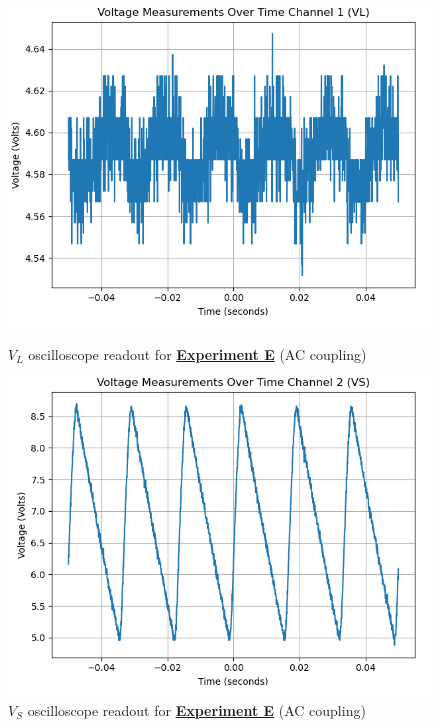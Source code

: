 \documentclass[
	letterpaper
	12pt
]{template}
\newcommand{\bref}[2]{\textbf{\hyperref[#1]{#2}}}
\begin{document}
\begin{figure}[H]\label{data::E2}
	\centering
	\begin{minipage}[c]{0.45\textwidth}
		\centering
		\includegraphics[width=\textwidth]{figures/E/2--ch1.png}
	    \caption{$V_{L}$ oscilloscope readout for \bref{exp::E}{Experiment E} (AC coupling)}
	\end{minipage}
	\hfill
	\begin{minipage}[c]{0.45\textwidth}
		\centering
		\includegraphics[width=\textwidth]{figures/E/2--ch2.png}
	    \caption{$V_{S}$ oscilloscope readout for \bref{exp::E}{Experiment E} (AC coupling)}
	\end{minipage}
\end{figure}
\end{document}
